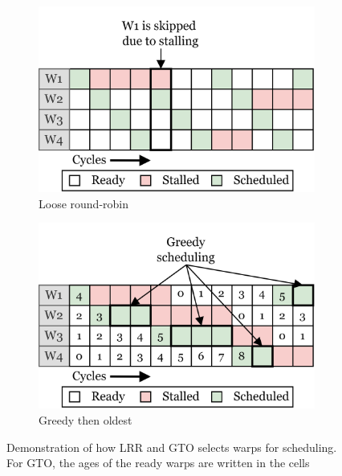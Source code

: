 \begin{figure}
     \centering
     \begin{subfigure}[b]{0.49\textwidth}
         \centering
         \includegraphics[width=\textwidth]{figures/warp-scheduling-lrr-2.png}
         \caption{Loose round-robin}
         \label{fig:lrr}
     \end{subfigure}
     \hfill
     \begin{subfigure}[b]{0.49\textwidth}
         \centering
         \includegraphics[width=\textwidth]{figures/warp-scheduling-gto-2.png}
         \caption{Greedy then oldest}
         \label{fig:gto}
     \end{subfigure}
    \caption[Demonstration of how LRR and GTO selects warps for scheduling]{Demonstration of how LRR and GTO selects warps for scheduling. For GTO, the ages of the ready warps are written in the cells}
    \label{fig:lrr_gto}
\end{figure}

